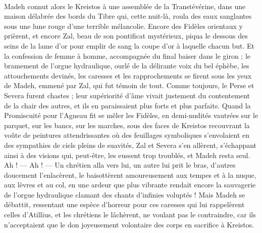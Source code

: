 \documentclass[a4paper, 11pt, oneside, polutonikogreek, french]{article}
\begin{document}
\paragraph{}
Madeh connut alors le Kreistos à une assemblée de la Transtévérine, dans une maison délabrée des bords du Tibre qui, cette nuit-là, roula des eaux sanglantes sous une lune rouge d'une terrible mélancolie. Encore des Fidèles orientaux y prièrent, et encore Zal, beau de son pontificat mystérieux, piqua le dessous des seins de la lame d'or pour emplir de sang la coupe d'or à laquelle chacun but. Et la confession de femme à homme, accompagnée du final baiser dans le giron ; le bramement de l'orgue hydraulique, ourlé de la délirante voix du bel éphèbe, les attouchements devinés, les caresses et les rapprochements se firent sous les yeux de Madeh, emmené par Zal, qui fut témoin de tout. Comme toujours, le Perse et Severa furent chastes ; leur supériorité d'âme vivait justement du contentement de la chair des autres, et ils en paraissaient plus forts et plus parfaits. Quand la Promiscuité pour l'Agneau fit se mêler les Fidèles, en demi-nudités vautrées sur le parquet, sur les bancs, sur les marches, sous des faces de Kreistos recouvrant la voûte de peintures attendrissantes où des feuillages symboliques s'envolaient en des sympathies de ciels pleins de suavités, Zal et Severa s'en allèrent, s'échappant ainsi à des visions qui, peut-être, les eussent trop troublés, et Madeh resta seul. Ah ! --- Ah ! --- Un chrétien alla vers lui, un autre lui prit le bras, d'autres doucement l'enlacèrent, le baisottèrent amoureusement aux tempes et à la nuque, aux lèvres et au col, en une ardeur que plus vibrante rendait encore la sauvagerie de l'orgue hydraulique clamant des chants d'infinies voluptés ! Mais Madeh se débattit, ressentant une espèce d'horreur pour ces caresses qui lui rappelèrent celles d'Atillius, et les chrétiens le lâchèrent, ne voulant pas le contraindre, car ils n'acceptaient que le don joyeusement volontaire des corps en sacrifice à Kreistos.
\end{document}
